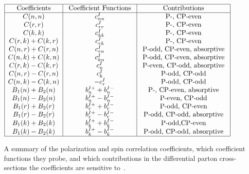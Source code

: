 \begin{table}[!h]
\begin{center}
\begin{math}
\begin{array}{|c|c|c|}
\hline 
\text { Coefficients } & \text { Coefficient Functions } & \text { Contributions } \\
\hline 
C(n, n) & c_{n n}^I & \text { P-, CP-even } \\
C(r, r) & c_{r r}^I & \text { P-, CP-even } \\
C(k, k) & c_{k k}^I & \text { P-, CP-even } \\
C(r, k)+C(k, r) & c_{r k}^I & \text { P-, CP-even } \\
C(n, r)+C(r, n) & c_{r n}^I & \text { P-odd, CP-even, absorptive } \\
C(n, k)+C(k, n) & c_{k n}^I & \text { P-odd, CP-even, absorptive } \\
C(r, k)-C(k, r) & c_n^I & \text { P-even, CP-odd, absorptive } \\
C(n, r)-C(r, n) & c_k^I & \text { P-odd, CP-odd } \\
C(n, k)-C(k, n) & -c_r^I & \text { P-odd, CP-odd } \\
B_1(n)+B_2(n) & b_n^{I+}+b_n^{I-} & \text { P-, CP-even, absorptive } \\
B_1(n)-B_2(n) & b_n^{I+}-b_n^{I-} & \text { P-even, CP-odd } \\
B_1(r)+B_2(r) & b_r^{I+}+b_r^{I-} & \text { P-odd, CP-even } \\
B_1(r)-B_2(r) & b_r^{I+}-b_r^{I-} & \text { P-odd, CP-odd, absorptive } \\
B_1(k)+B_2(k) & b_k^{I+}+b_k^{I-} & \text { P-odd,CP-even } \\
B_1(k)-B_2(k) & b_k^{I+}-b_k^{I-} & \text { P-odd, CP-odd, absorptive } \\
\hline
\end{array}
\end{math}
\caption{A summary of the polarization and spin correlation coefficients, which coefficient functions they probe, and which contributions in the differential parton cross-sections the coefficients are sensitive to~\cite{Bernreuther}. 
        }
\label{coefficients_sensitive}
\end{center}
\end{table}

